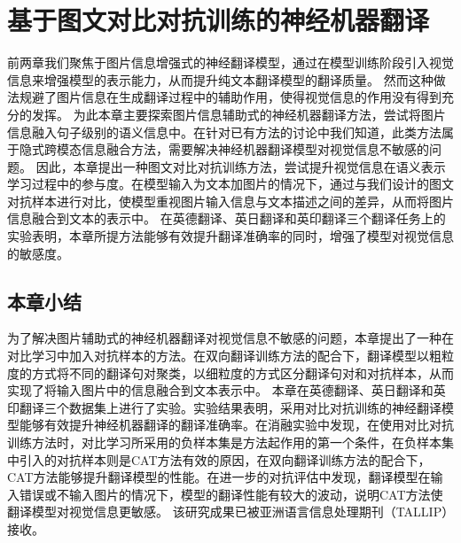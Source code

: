 \chapter{基于图文对比对抗训练的神经机器翻译}
前两章我们聚焦于图片信息增强式的神经翻译模型，通过在模型训练阶段引入视觉信息来增强模型的表示能力，从而提升纯文本翻译模型的翻译质量。
然而这种做法规避了图片信息在生成翻译过程中的辅助作用，使得视觉信息的作用没有得到充分的发挥。
为此本章主要探索图片信息辅助式的神经机器翻译方法，尝试将图片信息融入句子级别的语义信息中。在针对已有方法的讨论中我们知道，此类方法属于隐式跨模态信息融合方法，需要解决神经机器翻译模型对视觉信息不敏感的问题。
因此，本章提出一种图文对比对抗训练方法，尝试提升视觉信息在语义表示学习过程中的参与度。在模型输入为文本加图片的情况下，通过与我们设计的图文对抗样本进行对比，使模型重视图片输入信息与文本描述之间的差异，从而将图片信息融合到文本的表示中。
在英德翻译、英日翻译和英印翻译三个翻译任务上的实验表明，本章所提方法能够有效提升翻译准确率的同时，增强了模型对视觉信息的敏感度。







\section{本章小结}
为了解决图片辅助式的神经机器翻译对视觉信息不敏感的问题，本章提出了一种在对比学习中加入对抗样本的方法。在双向翻译训练方法的配合下，翻译模型以粗粒度的方式将不同的翻译句对聚类，以细粒度的方式区分翻译句对和对抗样本，从而实现了将输入图片中的信息融合到文本表示中。
本章在英德翻译、英日翻译和英印翻译三个数据集上进行了实验。实验结果表明，采用对比对抗训练的神经翻译模型能够有效提升神经机器翻译的翻译准确率。在消融实验中发现，在使用对比对抗训练方法时，对比学习所采用的负样本集是方法起作用的第一个条件，在负样本集中引入的对抗样本则是CAT方法有效的原因，在双向翻译训练方法的配合下，CAT方法能够提升翻译模型的性能。在进一步的对抗评估中发现，翻译模型在输入错误或不输入图片的情况下，模型的翻译性能有较大的波动，说明CAT方法使翻译模型对视觉信息更敏感。
该研究成果已被亚洲语言信息处理期刊（TALLIP）接收。